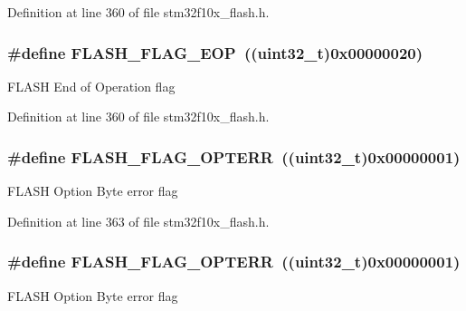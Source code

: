Definition at line 360 of file stm32f10x\+\_\+flash.\+h.

\subsubsection[{\texorpdfstring{F\+L\+A\+S\+H\+\_\+\+F\+L\+A\+G\+\_\+\+E\+OP}{FLASH_FLAG_EOP}}]{\setlength{\rightskip}{0pt plus 5cm}\#define F\+L\+A\+S\+H\+\_\+\+F\+L\+A\+G\+\_\+\+E\+OP~(({\bf uint32\+\_\+t})0x00000020)}\hypertarget{group___f_l_a_s_h___flags_gaf043ba4d8f837350bfc7754a99fae5a9}{}\label{group___f_l_a_s_h___flags_gaf043ba4d8f837350bfc7754a99fae5a9}
F\+L\+A\+SH End of Operation flag 

Definition at line 360 of file stm32f10x\+\_\+flash.\+h.

\subsubsection[{\texorpdfstring{F\+L\+A\+S\+H\+\_\+\+F\+L\+A\+G\+\_\+\+O\+P\+T\+E\+RR}{FLASH_FLAG_OPTERR}}]{\setlength{\rightskip}{0pt plus 5cm}\#define F\+L\+A\+S\+H\+\_\+\+F\+L\+A\+G\+\_\+\+O\+P\+T\+E\+RR~(({\bf uint32\+\_\+t})0x00000001)}\hypertarget{group___f_l_a_s_h___flags_gac36b0605df97c9414933369a32251e4a}{}\label{group___f_l_a_s_h___flags_gac36b0605df97c9414933369a32251e4a}
F\+L\+A\+SH Option Byte error flag 

Definition at line 363 of file stm32f10x\+\_\+flash.\+h.

\subsubsection[{\texorpdfstring{F\+L\+A\+S\+H\+\_\+\+F\+L\+A\+G\+\_\+\+O\+P\+T\+E\+RR}{FLASH_FLAG_OPTERR}}]{\setlength{\rightskip}{0pt plus 5cm}\#define F\+L\+A\+S\+H\+\_\+\+F\+L\+A\+G\+\_\+\+O\+P\+T\+E\+RR~(({\bf uint32\+\_\+t})0x00000001)}\hypertarget{group___f_l_a_s_h___flags_gac36b0605df97c9414933369a32251e4a}{}\label{group___f_l_a_s_h___flags_gac36b0605df97c9414933369a32251e4a}
F\+L\+A\+SH Option Byte error flag 

